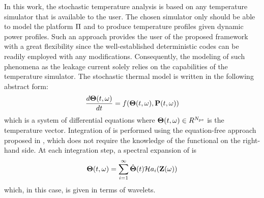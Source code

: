 In this work, the stochastic temperature analysis is based on any temperature simulator that is available to the user. The chosen simulator only should be able to model the platform $\Pi$ and to produce temperature profiles given dynamic power profiles. Such an approach provides the user of the proposed framework with a great flexibility since the well-established deterministic codes can be readily employed with any modifications. Consequently, the modeling of such phenomena as the leakage current solely relies on the capabilities of the temperature simulator. The stochastic thermal model is written in the following abstract form:
\begin{equation} \elabel{thermal-model}
  \frac{d\vT(\t, \o)}{dt} = f(\vT(\t, \o), \vPP(\t, \o))
\end{equation}
which is a system of differential equations where ${\boldsymbol\Theta}(t, \omega) \in R^{N_\text{pe}}$ is the temperature vector. Integration of  is performed using the equation-free approach proposed in \cite{xiu2005}, which does not require the knowledge of the functional on the right-hand side. At each integration step, a spectral expansion of  is
\[
  {\boldsymbol\Theta}(t, \omega) = \sum_{i = 1}^\infty \hat{{\boldsymbol\Theta}}(t) \mathcal{H}a_i(\mathbf{Z}(\omega))
\]
which, in this case, is given in terms of wavelets.
